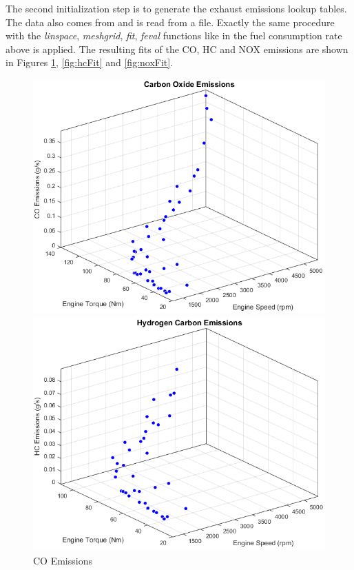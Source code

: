 The second initialization step is to generate the exhaust emissions lookup tables. The data also comes from \citet{argonne1999} and is read from a file. Exactly the same procedure with the \textit{linspace}, \textit{meshgrid}, \textit{fit}, \textit{feval} functions like in the fuel consumption rate above is applied. The resulting fits of the CO, HC and NOX emissions are shown in Figures \ref{fig:coFit}, \ref{fig:hcFit} and \ref{fig:noxFit}.

\begin{figure}[!htb]
  \includegraphics[scale=0.29]{figures/CO}
  \captionsetup{labelsep=space,justification=justified,singlelinecheck=off}
  \caption{CO Emissions}\label{fig:coFit}
\endminipage\hfill
{}
  \includegraphics[scale=0.29]{figures/HC}

\end{figure}

